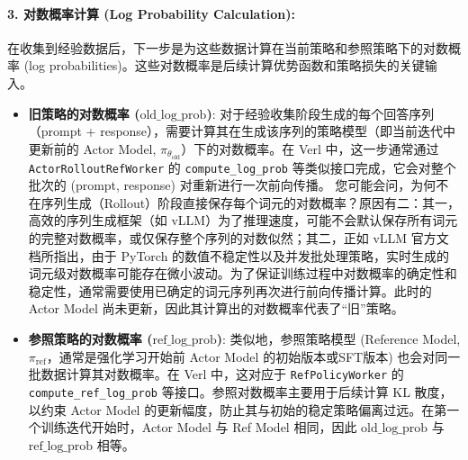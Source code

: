 \documentclass{pkuthesis}
\begin{document}

\paragraph{3. 对数概率计算 (Log Probability Calculation):}
在收集到经验数据后，下一步是为这些数据计算在当前策略和参照策略下的对数概率 (log probabilities)。这些对数概率是后续计算优势函数和策略损失的关键输入。
\begin{itemize}
    \item \textbf{旧策略的对数概率 ($\text{old\_log\_prob}$)}: 对于经验收集阶段生成的每个回答序列（prompt + response），需要计算其在生成该序列的策略模型（即当前迭代中更新前的 Actor Model, $\pi_{\theta_{\text{old}}}$）下的对数概率。在 Verl 中，这一步通常通过 \texttt{ActorRolloutRefWorker} 的 \texttt{compute\_log\_prob} 等类似接口完成，它会对整个批次的 (prompt, response) 对重新进行一次前向传播。
    您可能会问，为何不在序列生成（Rollout）阶段直接保存每个词元的对数概率？原因有二：其一，高效的序列生成框架（如 vLLM）为了推理速度，可能不会默认保存所有词元的完整对数概率，或仅保存整个序列的对数似然；其二，正如 vLLM 官方文档所指出，由于 PyTorch 的数值不稳定性以及并发批处理策略，实时生成的词元级对数概率可能存在微小波动。为了保证训练过程中对数概率的确定性和稳定性，通常需要使用已确定的词元序列再次进行前向传播计算。此时的 Actor Model 尚未更新，因此其计算出的对数概率代表了“旧”策略。

    \item \textbf{参照策略的对数概率 ($\text{ref\_log\_prob}$)}: 类似地，参照策略模型 (Reference Model, $\pi_{\text{ref}}$，通常是强化学习开始前 Actor Model 的初始版本或SFT版本) 也会对同一批数据计算其对数概率。在 Verl 中，这对应于 \texttt{RefPolicyWorker} 的 \texttt{compute\_ref\_log\_prob} 等接口。参照对数概率主要用于后续计算 KL 散度，以约束 Actor Model 的更新幅度，防止其与初始的稳定策略偏离过远。在第一个训练迭代开始时，Actor Model 与 Ref Model 相同，因此 $\text{old\_log\_prob}$ 与 $\text{ref\_log\_prob}$ 相等。
\end{itemize}
\end{document}

